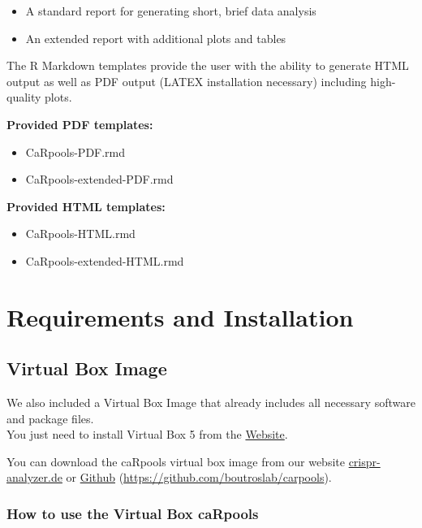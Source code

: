 \documentclass[]{article}
\providecommand{\tightlist}{%
  \setlength{\itemsep}{0pt}\setlength{\parskip}{0pt}}
\begin{document}
\begin{itemize}
\tightlist
\item
  A standard report for generating short, brief data analysis
\item
  An extended report with additional plots and tables
\end{itemize}

The R Markdown templates provide the user with the ability to generate
HTML output as well as PDF output (LATEX installation necessary)
including high-quality plots.

\textbf{Provided PDF templates:}

\begin{itemize}
\tightlist
\item
  CaRpools-PDF.rmd
\item
  CaRpools-extended-PDF.rmd
\end{itemize}

\textbf{Provided HTML templates:}

\begin{itemize}
\tightlist
\item
  CaRpools-HTML.rmd
\item
  CaRpools-extended-HTML.rmd
\end{itemize}

\newpage

\section{Requirements and
Installation}\label{requirements-and-installation}

\subsection{Virtual Box Image}\label{virtual-box-image}

We also included a Virtual Box Image that already includes all necessary
software and package files.\\
You just need to install Virtual Box 5 from the
\href{https://www.virtualbox.org}{Website}.

You can download the caRpools virtual box image from our website
\href{http://www.crispr-analyzer.de}{crispr-analyzer.de} or
\href{https://github.com/boutroslab/carpools}{Github}
(\url{https://github.com/boutroslab/carpools}).

\subsubsection{How to use the Virtual Box
caRpools}\label{how-to-use-the-virtual-box-carpools}
\end{document}
